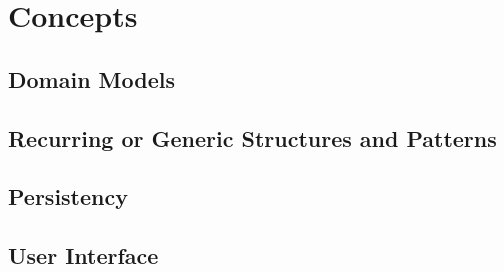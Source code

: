 
\chapter{Concepts}
\label{chap:Concepts}


\section{Domain Models}
\label{sec:Domain Models}


\section{Recurring or Generic Structures and Patterns}
\label{sec:Recurring or Generic Structures and Patterns}


\section{Persistency}
\label{sec:Persistency}


\section{User Interface}
\label{sec:User Interface}


